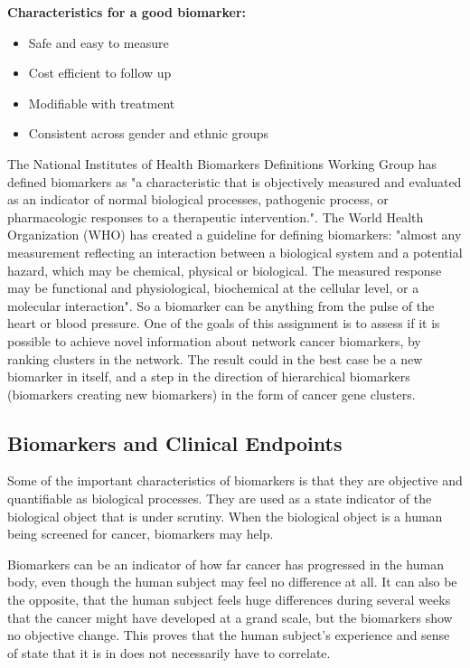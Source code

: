\textbf{Characteristics for a good biomarker:}
\begin{itemize}
    \item Safe and easy to measure
    \item Cost efficient to follow up
    \item Modifiable with treatment
    \item Consistent across gender and ethnic groups
\end{itemize}

The National Institutes of Health Biomarkers Definitions Working Group has
defined biomarkers as "a characteristic that is objectively measured and
evaluated as an indicator of normal biological processes, pathogenic process, or
pharmacologic responses to a therapeutic
intervention."\cite{biomarker2,biomarker3}. The World Health Organization (WHO)
has created a guideline for defining biomarkers: "almost any measurement
reflecting an interaction between a biological system and a potential hazard,
which may be chemical, physical or biological. The measured response may be
functional and physiological, biochemical at the cellular level, or a molecular
interaction". So a biomarker can be anything from the pulse of the heart or
blood pressure. One of the goals of this assignment is to assess if it is
possible to achieve novel information about network cancer biomarkers, by
ranking clusters in the network. The result could in the best case be a new
biomarker in itself, and a step in the direction of hierarchical biomarkers
(biomarkers creating new biomarkers) in the form of cancer gene clusters.

\subsection{Biomarkers and Clinical Endpoints} 
Some of the important characteristics of biomarkers is that they are objective
and quantifiable as biological processes\cite{biomarker3}. They are used as
a state indicator of the biological object that is under scrutiny. When the
biological object is a human being screened for cancer, biomarkers may help.

Biomarkers can be an indicator of how far cancer has progressed in the human
body, even though the human subject may feel no difference at all. It can also
be the opposite, that the human subject feels huge differences during several
weeks that the cancer might have developed at a grand scale, but the biomarkers
show no objective change. This proves that the human subject's experience and
sense of state that it is in does not necessarily have to correlate.

